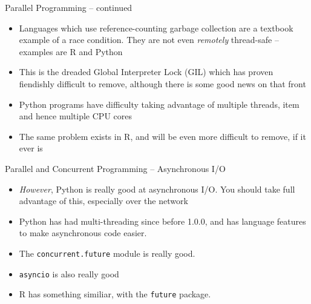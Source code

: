 \documentclass{beamer}
\begin{document}
\begin{frame}{Parallel Programming -- continued}
	\begin{itemize}
		\item Languages which use reference-counting garbage collection are a
		textbook example of a race condition. They are not even \emph{remotely}
		thread-safe -- examples are R and Python
		\item This is the dreaded Global
		Interpreter Lock (GIL) which has proven fiendishly difficult to remove,
		although there is some good news on that front
		\item Python programs have difficulty taking advantage of multiple threads,
		item and hence multiple CPU cores
		\item The same problem exists
		in R, and will be even more difficult to remove, if it ever is
	\end{itemize} 
\end{frame}

\begin{frame}{Parallel and Concurrent Programming -- Asynchronous I/O}
	\begin{itemize}
		\item \emph{However}, Python is really good at asynchronous I/O. You
		should take full advantage of this, especially over the network
		\item Python has had multi-threading since before 1.0.0, and has language
		features to make asynchronous code easier.
		\item The
		\texttt{concurrent.future} module is really good.
		\item \texttt{asyncio} is also really good
		\item R has something similiar, with the \texttt{future} package.
	\end{itemize}
\end{frame}
\end{document}

